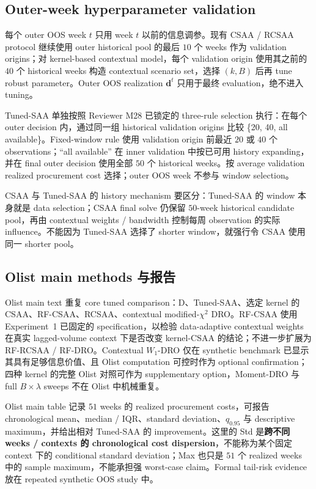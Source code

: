 \documentclass[11pt,a4paper]{ctexart}
\begin{document}
\subsection{Outer-week hyperparameter validation}

每个 outer OOS week $t$ 只用 week $t$ 以前的信息调参。现有 CSAA / RCSAA protocol 继续使用 outer historical pool 的最后 $10$ 个 weeks 作为 validation origins；对 kernel-based contextual model，每个 validation origin 使用其之前的 $40$ 个 historical weeks 构造 contextual scenario set，选择 $(k,B)$ 后再 tune robust parameter。Outer OOS realization $\boldsymbol d^t$ 只用于最终 evaluation，绝不进入 tuning。

Tuned-SAA 单独按照 Reviewer M28 已锁定的 three-rule selection 执行：在每个 outer decision 内，通过同一组 historical validation origins 比较 \{20, 40, all available\}。Fixed-window rule 使用 validation origin 前最近 $20$ 或 $40$ 个 observations；``all available'' 在 inner validation 中按已可用 history expanding，并在 final outer decision 使用全部 $50$ 个 historical weeks。按 average validation realized procurement cost 选择；outer OOS week 不参与 window selection。

CSAA 与 Tuned-SAA 的 history mechanism 要区分：Tuned-SAA 的 window 本身就是 data selection；CSAA final solve 仍保留 $50$-week historical candidate pool，再由 contextual weights / bandwidth 控制每周 observation 的实际 influence。不能因为 Tuned-SAA 选择了 shorter window，就强行令 CSAA 使用同一 shorter pool。

\subsection{Olist main methods 与报告}

Olist main text 重复 core tuned comparison：D、Tuned-SAA、选定 kernel 的 CSAA、RF-CSAA、RCSAA、contextual modified-$\chi^2$ DRO。RF-CSAA 使用 Experiment~1 已固定的 specification，以检验 data-adaptive contextual weights 在真实 lagged-volume context 下是否改变 kernel-CSAA 的结论；不进一步扩展为 RF-RCSAA / RF-DRO。Contextual $W_1$-DRO 仅在 synthetic benchmark 已显示其具有足够信息价值、且 Olist computation 可控时作为 optional confirmation；四种 kernel 的完整 Olist 对照可作为 supplementary option，Moment-DRO 与 full $B\times\lambda$ sweeps 不在 Olist 中机械重复。

Olist main table 记录 $51$ weeks 的 realized procurement costs，可报告 chronological mean、median / IQR、standard deviation、$q_{0.95}$ 与 descriptive maximum，并给出相对 Tuned-SAA 的 improvement。这里的 Std 是\textbf{跨不同 weeks / contexts 的 chronological cost dispersion}，不能称为某个固定 context 下的 conditional standard deviation；Max 也只是 $51$ 个 realized weeks 中的 sample maximum，不能承担强 worst-case claim。Formal tail-risk evidence 放在 repeated synthetic OOS study 中。
\end{document}
